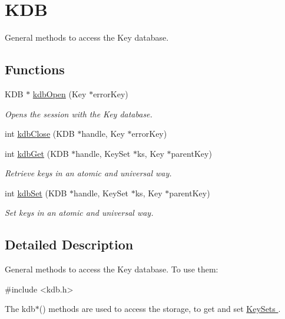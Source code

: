 \hypertarget{group__kdb}{\section{K\-D\-B}
\label{group__kdb}
}


General methods to access the Key database.  


\subsection*{Functions}
\begin{DoxyCompactItemize}
\item 
K\-D\-B $\ast$ \hyperlink{group__kdb_ga6808defe5870f328dd17910aacbdc6ca}{kdb\-Open} (Key $\ast$error\-Key)
\begin{DoxyCompactList}\small\item\em Opens the session with the Key database. \end{DoxyCompactList}\item 
int \hyperlink{group__kdb_gadb54dc9fda17ee07deb9444df745c96f}{kdb\-Close} (K\-D\-B $\ast$handle, Key $\ast$error\-Key)
\item 
int \hyperlink{group__kdb_ga28e385fd9cb7ccfe0b2f1ed2f62453a1}{kdb\-Get} (K\-D\-B $\ast$handle, Key\-Set $\ast$ks, Key $\ast$parent\-Key)
\begin{DoxyCompactList}\small\item\em Retrieve keys in an atomic and universal way. \end{DoxyCompactList}\item 
int \hyperlink{group__kdb_ga11436b058408f83d303ca5e996832bcf}{kdb\-Set} (K\-D\-B $\ast$handle, Key\-Set $\ast$ks, Key $\ast$parent\-Key)
\begin{DoxyCompactList}\small\item\em Set keys in an atomic and universal way. \end{DoxyCompactList}\end{DoxyCompactItemize}


\subsection{Detailed Description}
General methods to access the Key database. To use them\-: 
\begin{DoxyCode}
\textcolor{preprocessor}{#include <kdb.h>}
\end{DoxyCode}


The kdb$\ast$() methods are used to access the storage, to get and set \hyperlink{group__keyset}{Key\-Sets }.

